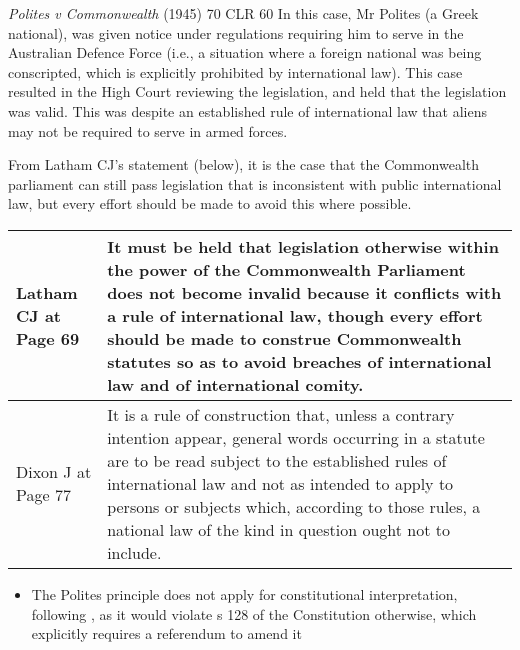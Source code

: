 \begin{casedetails}{\textit{Polites v Commonwealth} (1945) 70 CLR 60}\label{case:Polites v Commonwealth}
    \flushleft
    In this case, Mr Polites (a Greek national), was given notice under regulations requiring him to serve in the Australian Defence Force (i.e., a situation where a foreign national was being conscripted, which is explicitly prohibited by international law). This case resulted in the High Court reviewing the legislation, and held that the legislation was valid. This was despite an established rule of international law that aliens may not be required to serve in armed forces.

    \vspace{\baselineskip}

    From Latham CJ's statement (below), it is the case that the Commonwealth parliament can still pass legislation that is inconsistent with public international law, but every effort should be made to avoid this where possible.

    \begin{longtable}{p{}|>{\raggedright\arraybackslash}p{}}
        Latham CJ at Page 69 & It must be held that legislation otherwise within the power of the Commonwealth Parliament does not become invalid because it conflicts with a rule of international law, though every effort should be made to construe Commonwealth statutes so as to avoid breaches of international law and of international comity. \\\hline
        Dixon J at Page 77 & It is a rule of construction that, unless a contrary intention appear, general words occurring in a statute are to be read subject to the established rules of international law and not as intended to apply to persons or subjects which, according to those rules, a national law of the kind in question ought not to include.
    \end{longtable}  
\end{casedetails}

\begin{itemize}
    \item The Polites principle does not apply for constitutional interpretation, following , as it would violate s 128 of the Constitution otherwise, which explicitly requires a referendum to amend it
\end{itemize}

